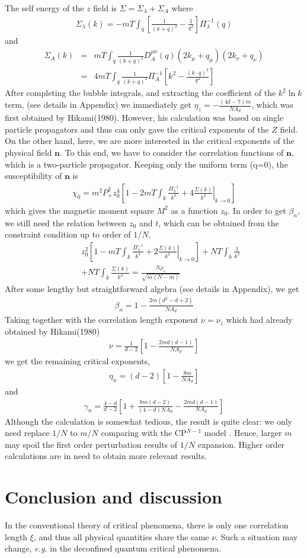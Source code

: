 \documentclass[aps,twocolumn,superscriptaddress]{revtex4-1}
\newcommand{\bea}{\begin{eqnarray}}
\newcommand{\eea}{\end{eqnarray}}
\newcommand{\bn}{\mathbf{n}}
\begin{document}
The self energy of the $z$ field is $\Sigma=\Sigma_\lambda+\Sigma_A$ where
\bea \Sigma_\lambda(k)=-mT\int_q \left[\frac{1}{(k+q)^2}-\frac{1}{q^2}\right]\Pi_\lambda^{-1}(q) \eea
and
\bea \Sigma_A(k) &=& mT\int_q \frac{1}{(k+q)^2} D_A^{\mu\nu}(q) (2k_\mu+q_\mu) (2k_\nu+q_\nu) \nonumber \\&=& 4mT\int_q \frac{1}{(k+q)^2}\Pi_A^{-1}\left[ k^2-\frac{(k\cdot q)^2}{q^2} \right] \eea
After completing the bubble integrals, and extracting the coefficient of the $k^2\ln k$ term, (see details in Appendix) we immediately get $\eta_z=-\frac{(4d-7)m}{NA_d}$, which was first obtained by Hikami(1980). However, his calculation was based on single particle propagators and thus can only gave the critical exponents of the $Z$ field. On the other hand, here, we are more interested in the critical exponents of the physical field $\bn$. To this end, we have to consider the correlation functions of $\bn$, which is a two-particle propagator. Keeping only the uniform term (q=0), the susceptibility of $\bn$ is
\bea \chi_0=m^2P_+^2 z_0^4\left[ 1-  2mT\int_k \frac{\Pi_\lambda^{-1}}{k^4} + 4 \left.\frac{\Sigma(k)}{k^2}\right|_{k\rightarrow0} \right] \eea
which gives the magnetic moment square $M^2$ as a function $z_0$. In order to get $\beta_n$, we still need the relation between $z_0$ and $t$, which can be obtained from the constraint condition up to order of $1/N$,
\bea &&z_0^2 \left[ 1-  mT\int_k \frac{\Pi_\lambda^{-1}}{k^4} + 2 \left.\frac{\Sigma(k)}{k^2}\right|_{k\rightarrow0}\right] + NT\int_k \frac{1}{k^2} \nonumber\\&&+ NT\int_k \frac{\Sigma(k)}{k^4} = \frac{N\rho_s}{\sqrt{m(N-m)}} \eea 
After some lengthy but straightforward algebra (see details in Appendix), we get 
\bea \beta_n=1-\frac{2m(d^2-d+2)}{NA_d} \eea
Taking together with the correlation length exponent $\nu=\nu_z$ which had already obtained by Hikami(1980)
\bea \nu=\frac{1}{d-2}\left[ 1-\frac{2md(d-1)}{NA_d} \right] \eea
we get the remaining critical exponents,
\bea \eta_n=(d-2)\left[1-\frac{8m}{NA_d}\right] \eea
and
\bea \gamma_n=\frac{4-d}{d-2}\left[ 1+\frac{8m(d-2)}{(4-d)NA_d}-\frac{2md(d-1)}{NA_d} \right] \eea
Although the calculation is somewhat tedious, the result is quite clear: we only need replace $1/N$ to $m/N$ comparing with the CP$^{N-1}$ model \cite{IKK1996}. Hence, larger $m$ may spoil the first order perturbation results of $1/N$ expansion. Higher order calculations are in need to obtain more relevant results. 


\section{Conclusion and discussion}
In the conventional theory of critical phenomena, there is only one correlation length $\xi$, and thus all physical quantities share the same $\nu$. Such a situation may change, \textit{e.g.} in the deconfined quantum critical phenomena.
\end{document}
